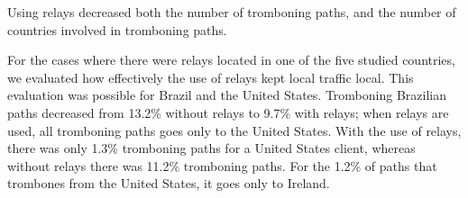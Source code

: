 \begin{finding}
Using relays decreased both the number of tromboning paths, and the
number of countries involved in tromboning paths.
\end{finding}
\noindent
For the cases where there were relays located in one of the five studied countries, we evaluated how effectively the use of relays kept local traffic local.  This evaluation was possible for Brazil and the United States.  Tromboning Brazilian paths decreased from 13.2\% without relays to 9.7\% with relays; when relays are used, all tromboning paths goes only to the United States.  With the use of relays, there was only 1.3\% tromboning paths for a United States client, whereas without relays there was 11.2\% tromboning paths.  For the 1.2\% of paths that trombones from the United States, it goes only to Ireland.


